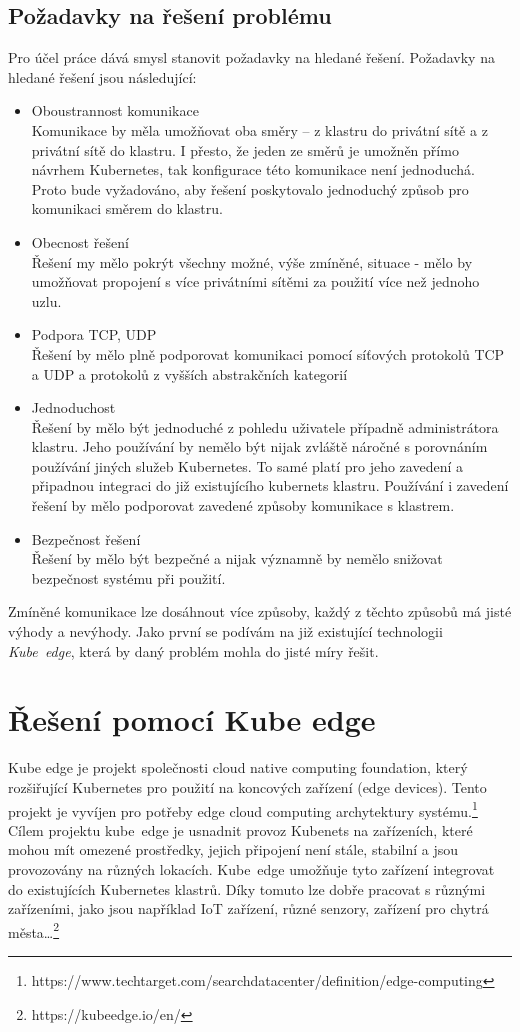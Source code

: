 \subsection{Požadavky na řešení problému}\label{sec:pozadavky}
Pro účel práce dává smysl stanovit požadavky na hledané řešení. Požadavky na hledané řešení jsou následující:
\begin{itemize}
    \item Oboustrannost komunikace\\
    Komunikace by měla umožňovat oba směry -- z klastru do privátní sítě a z privátní sítě do klastru. I přesto, že jeden ze směrů je umožněn přímo návrhem Kubernetes, tak konfigurace této komunikace není jednoduchá. Proto bude vyžadováno, aby řešení poskytovalo jednoduchý způsob pro komunikaci směrem do klastru.    
    \item Obecnost řešení\\
    Řešení my mělo pokrýt všechny možné, výše zmíněné, situace - mělo by umožňovat propojení s více privátními sítěmi za použití více než jednoho uzlu.
    \item Podpora TCP, UDP\\
    Řešení by mělo plně podporovat komunikaci pomocí síťových protokolů TCP a UDP a protokolů z vyšších abstrakčních kategorií
    \item Jednoduchost\\
    Řešení by mělo být jednoduché z pohledu uživatele případně administrátora klastru. Jeho používání by nemělo být nijak zvláště náročné s porovnáním používání jiných služeb Kubernetes. To samé platí pro jeho zavedení a připadnou integraci do již existujícího kubernets klastru. Používání i zavedení řešení by mělo podporovat zavedené způsoby komunikace s klastrem.
    \item Bezpečnost řešení\\
    Řešení by mělo být bezpečné a nijak významně by nemělo snižovat bezpečnost systému při použití.
\end{itemize}
\bigskip\medskip
Zmíněné komunikace lze dosáhnout více způsoby, každý z těchto způsobů má jisté výhody a nevýhody. Jako první se podívám na již existující technologii \textit{Kube~edge}, která by daný problém mohla do jisté míry řešit.
\section{Řešení pomocí Kube edge}
Kube edge je projekt společnosti cloud native computing foundation, který rozšiřující Kubernetes pro použití na koncových zařízení (edge devices). Tento projekt je vyvíjen pro potřeby edge cloud computing archytektury systému.\footnote{https://www.techtarget.com/searchdatacenter/definition/edge-computing} Cílem projektu kube~edge je usnadnit provoz Kubenets na zařízeních, které mohou mít omezené prostředky, jejich připojení není stále, stabilní a jsou provozovány na různých lokacích. Kube~edge umožňuje tyto zařízení integrovat do existujících Kubernetes klastrů. Díky tomuto lze dobře pracovat s různými zařízeními, jako jsou například IoT zařízení, různé senzory, zařízení pro chytrá města\ldots \footnote{https://kubeedge.io/en/}

